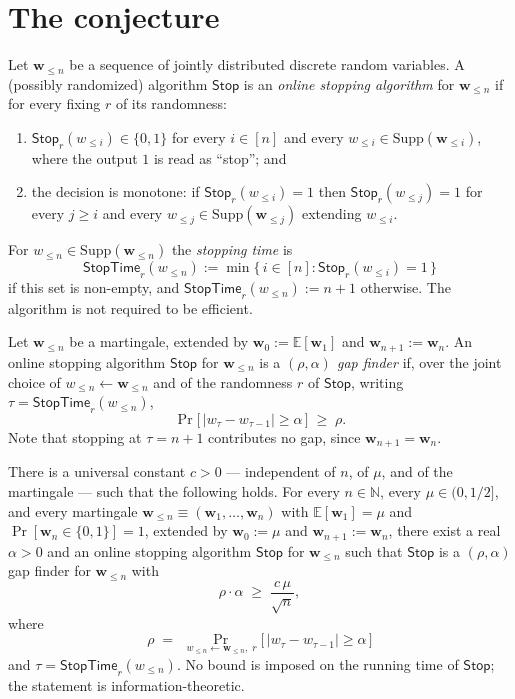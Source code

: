 \documentclass{aicr-conjecture}
\newcommand{\wv}{\mathbf{w}}
\newcommand{\Supp}{\mathrm{Supp}}
\newcommand{\Stop}{\mathsf{Stop}}
\newcommand{\StopTime}{\mathsf{StopTime}}
\newcommand{\Ex}{\mathbb{E}}
\newcommand{\Nat}{\mathbb{N}}
\begin{document}
\section{The conjecture}\label{sec:conjectures}

\begin{definition}\label{def:stop}
Let $\wv_{\le n}$ be a sequence of jointly distributed discrete random
variables. A (possibly randomized) algorithm $\Stop$ is an \emph{online
stopping algorithm} for $\wv_{\le n}$ if for every fixing $r$ of its
randomness:
\begin{enumerate}
\item $\Stop_r(w_{\le i}) \in \{0,1\}$ for every $i \in [n]$ and every
  $w_{\le i} \in \Supp(\wv_{\le i})$, where the output $1$ is read as
  ``stop''; and
\item the decision is monotone: if $\Stop_r(w_{\le i}) = 1$ then
  $\Stop_r(w_{\le j}) = 1$ for every $j \ge i$ and every
  $w_{\le j} \in \Supp(\wv_{\le j})$ extending $w_{\le i}$.
\end{enumerate}
For $w_{\le n} \in \Supp(\wv_{\le n})$ the \emph{stopping time} is
\[
  \StopTime_r(w_{\le n}) := \min\{\, i \in [n] : \Stop_r(w_{\le i}) = 1
  \,\}
\]
if this set is non-empty, and $\StopTime_r(w_{\le n}) := n+1$ otherwise.
The algorithm is not required to be efficient.
\end{definition}

\begin{definition}\label{def:gapfinder}
Let $\wv_{\le n}$ be a martingale, extended by $\wv_0 := \Ex[\wv_1]$ and
$\wv_{n+1} := \wv_n$. An online stopping algorithm $\Stop$ for
$\wv_{\le n}$ is a \emph{$(\rho,\alpha)$ gap finder} if, over the joint
choice of $w_{\le n} \leftarrow \wv_{\le n}$ and of the randomness $r$
of $\Stop$, writing $\tau = \StopTime_r(w_{\le n})$,
\[
  \Pr\bigl[\, |w_\tau - w_{\tau-1}| \ge \alpha \,\bigr] \;\ge\; \rho .
\]
Note that stopping at $\tau = n+1$ contributes no gap, since
$\wv_{n+1} = \wv_n$.
\end{definition}

\begin{conjecture}\label{conj:main}
There is a universal constant $c>0$ --- independent of $n$, of $\mu$,
and of the martingale --- such that the following holds. For every
$n \in \Nat$, every $\mu \in (0, 1/2]$, and every martingale
$\wv_{\le n} \equiv (\wv_1,\dots,\wv_n)$ with $\Ex[\wv_1] = \mu$ and
$\Pr[\wv_n \in \{0,1\}] = 1$, extended by $\wv_0 := \mu$ and
$\wv_{n+1} := \wv_n$, there exist a real $\alpha > 0$ and an online
stopping algorithm $\Stop$ for $\wv_{\le n}$ such that $\Stop$ is a
$(\rho,\alpha)$ gap finder for $\wv_{\le n}$ with
\[
  \rho \cdot \alpha \;\ge\; \frac{c\,\mu}{\sqrt{n}},
\]
where
\[
  \rho \;=\; \Pr_{\,w_{\le n} \leftarrow \wv_{\le n},\; r}
  \bigl[\, \bigl|w_{\tau} - w_{\tau-1}\bigr| \ge \alpha \,\bigr]
\]
and $\tau = \StopTime_r(w_{\le n})$. No bound is imposed on the running
time of $\Stop$; the statement is information-theoretic.
\end{conjecture}
\end{document}
